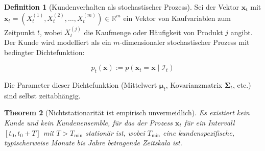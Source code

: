 \documentclass[a4paper, 12pt, twoside, openright]{report}
\newtheorem{theorem}{Theorem}[section]
\theoremstyle{definition}
\newtheorem{definition}[theorem]{Definition}
\theoremstyle{definition}
\newcommand{\R}{\mathbb{R}}
\newcommand{\vx}{\bm{x}}
\begin{document}
\begin{definition}[Kundenverhalten als stochastischer Prozess]
Sei der Vektor $\vx_t$ mit $\vx_t = (X_t^{(1)}, X_t^{(2)}, \ldots, X_t^{(m)}) \in \R^m$ ein Vektor von Kaufvariablen zum Zeitpunkt $t$, wobei $X_t^{(j)}$ die Kaufmenge oder Häufigkeit von Produkt $j$ angibt. Der Kunde wird modelliert als ein $m$-dimensionaler stochastischer Prozess mit bedingter Dichtefunktion:

\begin{equation}
p_t(\vx) := p(\vx_t = \vx \mid \mathcal{I}_t)
\label{eq:customer_pdf}
\end{equation}

Die Parameter dieser Dichtefunktion (Mittelwert $\bm{\mu}_t$, Kovarianzmatrix $\bm{\Sigma}_t$, etc.) sind selbst zeitabhängig.
\end{definition}

\begin{theorem}[Nichtstationarität ist empirisch unvermeidlich]
\label{thm:nonstationarity}
Es existiert kein Kunde und kein Kundenensemble, für das der Prozess $\vx_t$ für ein Intervall $[t_0, t_0 + T]$ mit $T > T_{\min}$ stationär ist, wobei $T_{\min}$ eine kundenspezifische, typischerweise Monate bis Jahre betragende Zeitskala ist.
\end{theorem}
\end{document}

